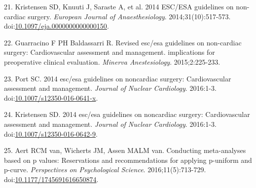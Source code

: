 \documentclass[]{article}
\begin{document}
\hypertarget{ref-Kristensen_2014}{}
21. Kristensen SD, Knuuti J, Saraste A, et al. 2014 ESC/ESA guidelines
on non-cardiac surgery. \emph{European Journal of Anaesthesiology}.
2014;31(10):517-573.
doi:\href{https://doi.org/10.1097/eja.0000000000000150}{10.1097/eja.0000000000000150}.

\hypertarget{ref-guarracino2015}{}
22. Guarracino F PH Baldassarri R. Revised esc/esa guidelines on
non-cardiac surgery: Cardiovascular assessment and management.
implications for preoperative clinical evaluation. \emph{Minerva
Anestesiology}. 2015;2:225-233.

\hypertarget{ref-Port2016}{}
23. Port SC. 2014 esc/esa guidelines on noncardiac surgery:
Cardiovascular assessment and management. \emph{Journal of Nuclear
Cardiology}. 2016:1-3.
doi:\href{https://doi.org/10.1007/s12350-016-0641-x}{10.1007/s12350-016-0641-x}.

\hypertarget{ref-Kristensen2016}{}
24. Kristensen SD. 2014 esc/esa guidelines on noncardiac surgery:
Cardiovascular assessment and management. \emph{Journal of Nuclear
Cardiology}. 2016:1-3.
doi:\href{https://doi.org/10.1007/s12350-016-0642-9}{10.1007/s12350-016-0642-9}.

\hypertarget{ref-van_Aert_2016}{}
25. Aert RCM van, Wicherts JM, Assen MALM van. Conducting meta-analyses
based on p values: Reservations and recommendations for applying
p-uniform and p-curve. \emph{Perspectives on Psychological Science}.
2016;11(5):713-729.
doi:\href{https://doi.org/10.1177/1745691616650874}{10.1177/1745691616650874}.
\end{document}
